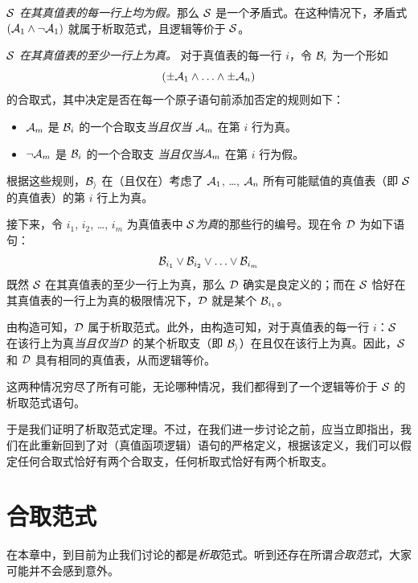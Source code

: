 \begin{numberlist}
		\item\emph{$\mathcal{S}$ 在其真值表的每一行上均为假。}那么 $\mathcal{S}$ 是一个矛盾式。在这种情况下，矛盾式 $(\mathcal{A}_1 \wedge \neg \mathcal{A}_1)$ 就属于析取范式，且逻辑等价于 $\mathcal{S}$。

		\item\emph{$\mathcal{S}$ 在其真值表的至少一行上为真。}
		对于真值表的每一行 $i$，令 $\mathcal{B}_i$ 为一个形如
		$$(\pm\mathcal{A}_1 \land \ldots \land \pm\mathcal{A}_n)$$
		的合取式，其中决定是否在每一个原子语句前添加否定的规则如下：
			\begin{itemize}
				\item
				$\mathcal{A}_m$ 是 $\mathcal{B}_i$ 的一个合取支\emph{当且仅当}
				$\mathcal{A}_m$ 在第 $i$ 行为真。
				\item $\neg\mathcal{A}_m$ 是 $\mathcal{B}_i$ 的一个合取支
				\emph{当且仅当}$\mathcal{A}_m$ 在第 $i$ 行为假。
			\end{itemize}
		根据这些规则，$\mathcal{B_i}$ 在（且仅在）考虑了 $\mathcal{A}_1$, \ldots, $\mathcal{A}_n$ 所有可能赋值的真值表（即 $\mathcal{S}$ 的真值表）的第 $i$ 行上为真。

		接下来，令 $i_1$, $i_2$, \dots, $i_m$ 为真值表中 $\mathcal{S}$\emph{为真}的那些行的编号。现在令 $\mathcal{D}$ 为如下语句：
		$$\mathcal{B}_{i_1} \vee \mathcal{B}_{i_2} \vee \ldots \vee \mathcal{B}_{i_m}$$
		既然 $\mathcal{S}$ 在其真值表的至少一行上为真，那么 $\mathcal{D}$ 确实是良定义的；而在 $\mathcal{S}$ 恰好在其真值表的一行上为真的极限情况下，$\mathcal{D}$ 就是某个 $\mathcal{B}_{i_1}$。

		由构造可知，$\mathcal{D}$ 属于析取范式。此外，由构造可知，对于真值表的每一行 $i$：$\mathcal{S}$ 在该行上为真\emph{当且仅当}$\mathcal{D}$ 的某个析取支（即 $\mathcal{B_i}$）在且仅在该行上为真。因此，$\mathcal{S}$ 和 $\mathcal{D}$ 具有相同的真值表，从而逻辑等价。
	\end{numberlist}


	这两种情况穷尽了所有可能，无论哪种情况，我们都得到了一个逻辑等价于 $\mathcal{S}$ 的析取范式语句。

于是我们证明了析取范式定理。不过，在我们进一步讨论之前，应当立即指出，我们在此重新回到了对（真值函项逻辑）语句的严格定义，根据该定义，我们可以假定任何合取式恰好有两个合取支，任何析取式恰好有两个析取支。

\section{合取范式}
\label{s:CNF}

在本章中，到目前为止我们讨论的都是\emph{析取}范式。听到还存在所谓\emph{合取范式}，大家可能并不会感到意外。


